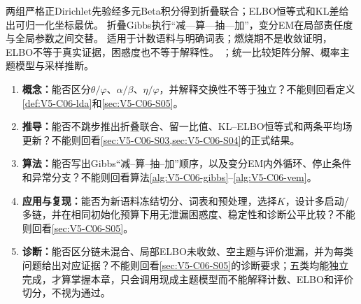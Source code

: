 \begin{SLCompactClosure}
\label{struct:V5-C06-CH36}
{两组严格正Dirichlet先验经多元Beta积分得到折叠联合；ELBO恒等式和KL差给出可归一化坐标最优。}
{折叠Gibbs执行“减—算—抽—加”，变分EM在局部责任度与全局参数之间交替。}
{适用于计数语料与明确词表；燃烧期不是收敛证明，ELBO不等于真实证据，困惑度也不等于解释性。}
{；统一比较矩阵分解、概率主题模型与采样推断。}

\label{struct:V5-C06-CH37}
\begin{selfcheckbox}
\begin{enumerate}[leftmargin=2.2em]
  \item \textbf{概念：}能否区分$\theta/\varphi$、$\alpha/\beta$、$\eta/\varphi$，并解释交换性不等于独立？不能则回看定义\ref{def:V5-C06-lda}和\cref{sec:V5-C06-S05}。
  \item \textbf{推导：}能否不跳步推出折叠联合、留一比值、KL--ELBO恒等式和两条平均场更新？不能则回看\cref{sec:V5-C06-S03,sec:V5-C06-S04}的正式结果。
  \item \textbf{算法：}能否写出Gibbs“减--算--抽--加”顺序，以及变分EM内外循环、停止条件和异常分支？不能则回看算法\ref{alg:V5-C06-gibbs}--\ref{alg:V5-C06-vem}。
  \item \textbf{应用与复现：}能否为新语料冻结切分、词表和预处理，选择$K$，设计多启动/多链，并在相同初始化预算下用无泄漏困惑度、稳定性和诊断公平比较？不能则回看\cref{sec:V5-C06-S05}。
  \item \textbf{诊断：}能否区分链未混合、局部ELBO未收敛、空主题与评价泄漏，并为每类问题给出对应证据？不能则回看\cref{sec:V5-C06-S05}的诊断要求；五类均能独立完成，才算掌握本章，只会调用现成主题模型而不能解释计数、ELBO和评价切分，不视为通过。
\end{enumerate}
\end{selfcheckbox}
\end{SLCompactClosure}
